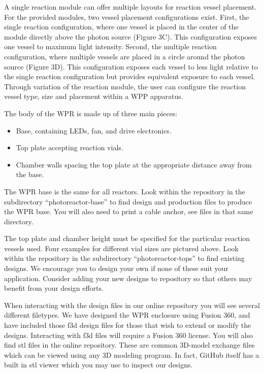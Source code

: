 \documentclass[11pt]{article}
\begin{document}
A single reaction module can offer multiple layouts for reaction vessel placement.
For the provided modules, two vessel placement configurations exist.
First, the single reaction configuration, where one vessel is placed in the center of the module directly above the photon source (Figure 3C).
This configuration exposes one vessel to maximum light intensity.
Second, the multiple reaction configuration, where multiple vessels are placed in a circle around the photon source (Figure 3D).
This configuration exposes each vessel to less light relative to the single reaction configuration but provides equivalent exposure to each vessel.
Through variation of the reaction module, the user can configure the reaction vessel type, size and placement within a WPP apparatus.

The body of the WPR is made up of three main pieces:

\begin{itemize}
    \item Base, containing LEDs, fan, and drive electronics.
    \item Top plate accepting reaction vials.
    \item Chamber walls spacing the top plate at the appropriate distance away from the base.
\end{itemize}

The WPR base is the same for all reactors.
Look within the repository in the subdirectory ``photoreactor-base'' to find design and production files to produce the WPR base.
You will also need to print a cable anchor, see files in that same directory.

The top plate and chamber height must be specified for the particular reaction vessels used.
Four examples for different vial sizes are pictured above.
Look within the repository in the subdirectory ``photoreactor-tops'' to find existing designs.
We encourage you to design your own if none of these suit your application.
Consider adding your new designs to repository so that others may benefit from your design efforts.

When interacting with the design files in our online repository you will see several different filetypes.
We have designed the WPR enclosure using Fusion 360, and have included those f3d design files for those that wish to extend or modify the designs.
Interacting with f3d files will require a Fusion 360 license.
You will also find stl files in the online repository.
These are common 3D-model exchange files which can be viewed using any 3D modeling program.
In fact, GitHub itself has a built in stl viewer which you may use to inspect our designs.
\end{document}
